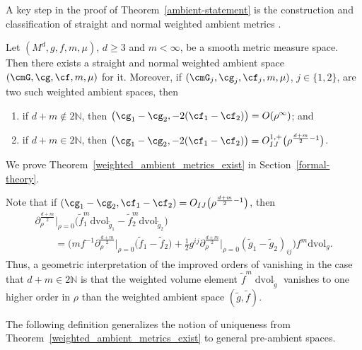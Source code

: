 A key step in the proof of Theorem~\ref{ambient-statement} is the construction and classification of straight and normal weighted ambient metrics \cite{FeffermanGraham2012}.

\begin{Theorem}
 \label{weighted_ambient_metrics_exist}
 Let $(M^d,g,f,m,\mu)$, $d\geq 3$ and $m<\infty$, be a smooth metric measure space. Then there exists a straight and normal weighted ambient space $(\cmG,\cg,\cf,m,\mu)$ for it. Moreover, if $(\cmG_j,\cg_j,\cf_j,m,\mu)$, $j\in\{1,2\}$, are two such weighted ambient spaces, then
\begin{enumerate}[label=$(\roman*)$]\itemsep=0pt
 \item if $d+m\notin 2\mathbb{N}$, then $\big(\cg_1-\cg_2,-2(\cf_1-\cf_2)\big)=O(\rho^\infty)$; and
 \item if $d+m\in 2\mathbb{N}$, then $\big(\cg_1-\cg_2,-2(\cf_1-\cf_2)\big)=O_{IJ}^{1,+}\big(\rho^{\frac{d+m}{2}-1}\big)$.
 \end{enumerate}
\end{Theorem}

We prove Theorem~\ref{weighted_ambient_metrics_exist} in Section~\ref{formal-theory}.

Note that if $(\cg_1-\cg_2,\cf_1-\cf_2)=O_{IJ}\big(\rho^{\frac{d+m}{2}-1}\big)$, then
\begin{gather*}
{\partial^{\frac{d+m}{2}}_\rho}\big|_{\rho=0}\big(\widetilde{f}_1^m\mathrm{dvol}_{\widetilde{g}_1}- \widetilde{f}_2^m\mathrm{dvol}_{\widetilde{g}_2}\big)
\\ \qquad
{}= \biggl(mf^{-1}{\partial_\rho^{\frac{d+m}{2}}}\big|_{\rho=0}\big(\widetilde{f}_1-\widetilde{f}_2\big)
+\frac{1}{2}g^{ij}{\partial_\rho^{\frac{d+m}{2}}}\big|_{\rho=0} (\widetilde{g}_1-\widetilde{g}_2)_{ij}\biggr)f^m\mathrm{dvol}_{g}.
\end{gather*}
Thus, a geometric interpretation of the improved orders of vanishing in the case that $d+m\in 2\mathbb{N}$ is that the weighted volume element $\widetilde{f}^m\operatorname{dvol}_{\widetilde{g}}$ vanishes to one higher order in $\rho$ than the weighted ambient space $(\widetilde{g},\widetilde{f})$.

The following definition generalizes the notion of uniqueness from Theorem~\ref{weighted_ambient_metrics_exist} to general pre-ambient spaces.

